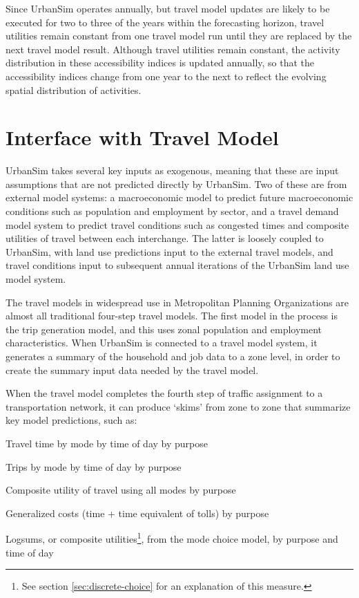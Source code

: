 Since UrbanSim operates annually, but travel model updates are
likely to be executed for two to three of the years within the
forecasting horizon, travel utilities remain constant from one
travel model run until they are replaced by the next travel model
result. Although travel utilities remain constant, the activity
distribution in these accessibility indices is updated annually,
so that the accessibility indices change from one year to the next
to reflect the evolving spatial distribution of activities.


\section{Interface with Travel Model}

UrbanSim takes several key inputs as exogenous, meaning that these
are input assumptions that are not predicted directly by UrbanSim.  Two of these are
from external model systems: a macroeconomic model to predict
future macroeconomic conditions such as population and employment
by sector, and a travel demand model system to predict travel
conditions such as congested times and composite utilities of
travel between each interchange.  The latter is loosely coupled to
UrbanSim, with land use predictions input to the external travel
models, and travel conditions input to subsequent annual
iterations of the UrbanSim land use model system.

The travel models in widespread use in Metropolitan Planning Organizations are
almost all traditional four-step travel models.  The first model in the process
is the trip generation model, and this uses zonal population and employment
characteristics.  When UrbanSim is connected to a travel model system,
it generates a summary of the household and job data to a zone level, in order
to create the summary input data needed by the travel model.

When the travel model completes the fourth step of traffic assignment to a
transportation network, it can produce `skims' from zone to zone that summarize
key model predictions, such as:

\squishlist
\item   Travel time by mode by time of day by purpose
\item Trips by mode by time of day by purpose
\item   Composite utility of travel using all modes by purpose
\item Generalized costs (time + time equivalent of tolls) by purpose
\item Logsums, or composite utilities\footnote{See section \ref{sec:discrete-choice} for an explanation of this measure.}, from the mode choice model, by purpose and time of day
\squishend

